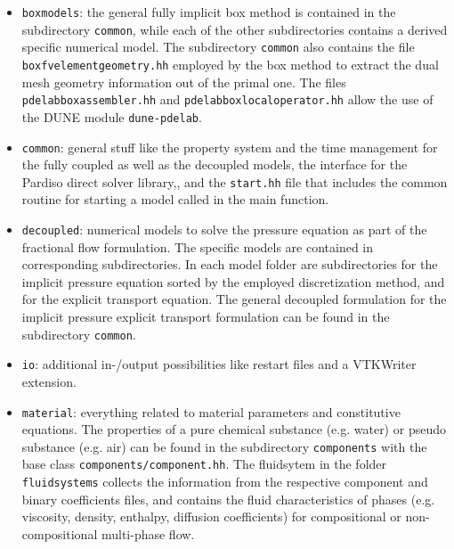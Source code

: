 \begin{itemize} 

\item \texttt{boxmodels}:
the general fully implicit box method is contained in the subdirectory 
\texttt{common}, while each of the other subdirectories contains 
a derived specific numerical model. The subdirectory \texttt{common} also contains the file \texttt{boxfvelementgeometry.hh} employed by the box method to extract the dual mesh geometry information out of the primal one. The files \texttt{pdelabboxassembler.hh} and \texttt{pdelabboxlocaloperator.hh} allow the use of the DUNE module \texttt{dune-pdelab}. 

\item \texttt{common}:
general stuff like the property system and the time management for the 
fully coupled as well as the decoupled models, the interface for the Pardiso direct solver library,\cite{Pardiso}, and the \texttt{start.hh} file that includes the common routine for starting a model called in the main function. 

\item \texttt{decoupled}:
 numerical models to solve the pressure equation as part of the fractional flow formulation. The specific models are contained 
 in corresponding subdirectories. In each model folder are subdirectories for the implicit pressure equation sorted by the employed discretization method, and for the explicit transport equation. The general decoupled formulation for the implicit pressure explicit transport formulation can be found in the subdirectory \texttt{common}.




\item \texttt{io}: additional in-/output possibilities like restart files 
and a VTKWriter extension. 

\item \texttt{material}: everything related to material parameters and 
constitutive equations. The properties of a pure chemical substance (e.g. water) or pseudo substance (e.g. air) can be found in the subdirectory \texttt{components} with the base class \texttt{components/component.hh}. The fluidsytem in the folder \texttt{fluidsystems} collects the information from the respective component and binary coefficients files, and contains the fluid characteristics of phases (e.g. viscosity, density, enthalpy, diffusion coefficients) for compositional or non-compositional multi-phase flow. 


\end{itemize}
